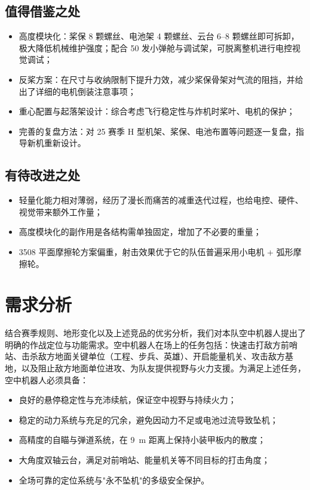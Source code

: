 \subsection{值得借鉴之处}
\begin{itemize}
    \item 高度模块化：桨保 8 颗螺丝、电池架 4 颗螺丝、云台 6--8 颗螺丝即可拆卸，极大降低机械维护强度；配合 50 发小弹舱与调试架，可脱离整机进行电控视觉调试；
    \item 反桨方案：在尺寸与收纳限制下提升力效，减少桨保骨架对气流的阻挡，并给出了详细的电机倒装注意事项；
    \item 重心配置与起落架设计：综合考虑飞行稳定性与炸机时桨叶、电机的保护；
    \item 完善的复盘方法：对 25 赛季 H 型机架、桨保、电池布置等问题逐一复盘，指导新机重新设计。
\end{itemize}

\subsection{有待改进之处}
\begin{itemize}
    \item 轻量化能力相对薄弱，经历了漫长而痛苦的减重迭代过程，也给电控、硬件、视觉带来额外工作量；
    \item 高度模块化的副作用是各结构需单独固定，增加了不必要的重量；
    \item 3508 平面摩擦轮方案偏重，射击效果优于它的队伍普遍采用小电机 + 弧形摩擦轮。
\end{itemize}

\section{需求分析}

结合赛季规则、地形变化以及上述竞品的优劣分析，我们对本队空中机器人提出了明确的作战定位与功能需求。空中机器人在场上的任务包括：快速击打敌方前哨站、击杀敌方地面关键单位（工程、步兵、英雄）、开启能量机关、攻击敌方基地，以及阻止敌方地面单位进攻、为队友提供视野与火力支援。为满足上述任务，空中机器人必须具备：
\begin{itemize}
    \item 良好的悬停稳定性与充沛续航，保证空中视野与持续火力；
    \item 稳定的动力系统与充足的冗余，避免因动力不足或电池过流导致坠机；
    \item 高精度的自瞄与弹道系统，在 \qty{9}{\m} 距离上保持小装甲板内的散度；
    \item 大角度双轴云台，满足对前哨站、能量机关等不同目标的打击角度；
    \item 全场可靠的定位系统与"永不坠机"的多级安全保护。
\end{itemize}

